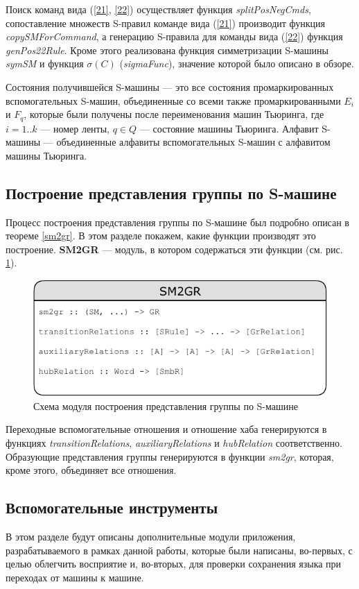 \documentclass[14pt]{matmex-diploma-custom}
\begin{document}
Поиск команд вида (\ref{21}, \ref{22}) осуществляет функция \textit{splitPosNegCmds}, сопоставление множеств S-правил команде вида (\ref{21}) производит функция \textit{copySMForCommand}, а генерацию S-правила для команды вида (\ref{22}) функция \textit{genPos22Rule}.
Кроме этого реализована функция симметризации S-машины \textit{symSM} и функция $\sigma(C)$ (\textit{sigmaFunc}), значение которой было описано в обзоре.

Состояния получившейся S-машины --- это все состояния промаркированных вспомогательных S-машин, объединенные со всеми также промаркированными $E_i$ и $F_q$, которые были получены после переименования машин Тьюринга, где $i=1..k$ --- номер ленты, $q \in Q$ --- состояние машины Тьюринга.
Алфавит S-машины --- объединенные алфавиты вспомогательных S-машин с алфавитом машины Тьюринга. 

\subsection{Построение представления группы по S-машине}
Процесс построения представления группы по S-машине был подробно описан в теореме \ref{sm2gr}. В этом разделе покажем, какие функции производят это построение. 
\textbf{SM2GR} --- модуль, в котором содержаться эти функции (см. рис. \ref{fig:SM2GR}).

\begin{figure}[H]
\centering
  \includegraphics[width=\linewidth]{pics/SM2GR.pdf}
  \caption{Схема модуля построения представления группы по S-машине}
  \label{fig:SM2GR}
\end{figure}

Переходные вспомогательные отношения и отношение хаба генерируются в функциях \textit{transitionRelations}, \textit{auxiliaryRelations} и \textit{hubRelation} соответственно. Образующие представления группы генерируются в функции \textit{sm2gr}, которая, кроме этого, объединяет все отношения.

\subsection{Вспомогательные инструменты}
В этом разделе будут описаны дополнительные модули приложения, разрабатываемого в рамках данной работы, которые были написаны, во-первых, с целью облегчить восприятие и, во-вторых, для проверки сохранения языка при переходах от машины к машине. 
\end{document}
